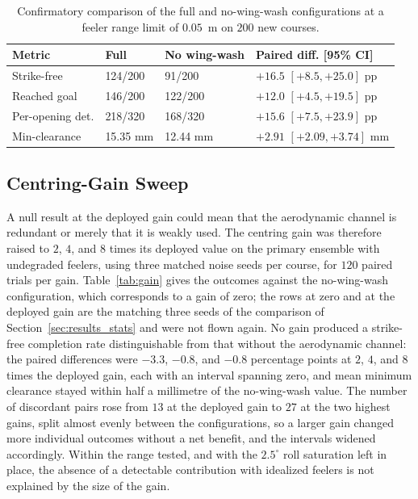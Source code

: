 \documentclass[final,5p,times]{elsarticle}
\begin{document}
\begin{table}[t]
\centering
\caption{Confirmatory comparison of the full and no-wing-wash configurations at a feeler range limit of $0.05$~m on $200$ new courses.}
\label{tab:confirm}
\footnotesize\setlength{\tabcolsep}{3pt}
\begin{tabular*}{\columnwidth}{@{\extracolsep{\fill}}llll@{}}
\toprule
Metric & Full & No wing-wash & Paired diff. [95\% CI] \\
\midrule
Strike-free & 124/200 & 91/200 & $+16.5$ $[+8.5, +25.0]$ pp \\
Reached goal & 146/200 & 122/200 & $+12.0$ $[+4.5, +19.5]$ pp \\
Per-opening det. & 218/320 & 168/320 & $+15.6$ $[+7.5, +23.9]$ pp \\
Min-clearance & 15.35 mm & 12.44 mm & $+2.91$ $[+2.09, +3.74]$ mm \\
\bottomrule
\end{tabular*}
\end{table}

\subsection{Centring-Gain Sweep}
\label{sec:results_gain}

A null result at the deployed gain could mean that the aerodynamic channel is redundant or merely that it is weakly used. The centring gain was therefore raised to $2$, $4$, and $8$ times its deployed value on the primary ensemble with undegraded feelers, using three matched noise seeds per course, for $120$ paired trials per gain. Table~\ref{tab:gain} gives the outcomes against the no-wing-wash configuration, which corresponds to a gain of zero; the rows at zero and at the deployed gain are the matching three seeds of the comparison of Section~\ref{sec:results_stats} and were not flown again. No gain produced a strike-free completion rate distinguishable from that without the aerodynamic channel: the paired differences were $-3.3$, $-0.8$, and $-0.8$ percentage points at $2$, $4$, and $8$ times the deployed gain, each with an interval spanning zero, and mean minimum clearance stayed within half a millimetre of the no-wing-wash value. The number of discordant pairs rose from $13$ at the deployed gain to $27$ at the two highest gains, split almost evenly between the configurations, so a larger gain changed more individual outcomes without a net benefit, and the intervals widened accordingly. Within the range tested, and with the $2.5^\circ$ roll saturation left in place, the absence of a detectable contribution with idealized feelers is not explained by the size of the gain.
\end{document}
